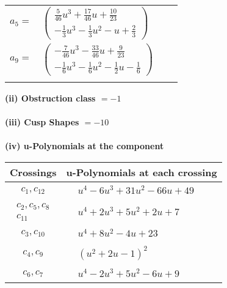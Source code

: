 \documentclass[1p]{elsarticle_modified}
\theoremstyle{definition}
\begin{document}
\begin{tabular}{m{7pt} m{180pt} m{7pt} m{180pt} }
\flushright $a_{5}=$&$\begin{pmatrix}\frac{5}{46} u^3+\frac{17}{46} u+\frac{10}{23}\\-\frac{1}{3} u^3-\frac{1}{3} u^2- u+\frac{2}{3}\end{pmatrix}$ \\
\flushright $a_{9}=$&$\begin{pmatrix}-\frac{7}{46} u^3-\frac{33}{46} u+\frac{9}{23}\\-\frac{1}{6} u^3-\frac{1}{6} u^2-\frac{1}{2} u-\frac{1}{6}\end{pmatrix}$\\&\end{tabular}
\flushleft \textbf{(ii) Obstruction class $= -1$}\\~\\
\flushleft \textbf{(iii) Cusp Shapes $= -10$}\\~\\
\newpage\renewcommand{\arraystretch}{1}
\flushleft \textbf{(iv) u-Polynomials at the component}\newline \\
\begin{tabular}{m{50pt}|m{274pt}}
Crossings & \hspace{64pt}u-Polynomials at each crossing \\
\hline $$\begin{aligned}c_{1},c_{12}\end{aligned}$$&$\begin{aligned}
&u^4-6 u^3+31 u^2-66 u+49
\end{aligned}$\\
\hline $$\begin{aligned}c_{2},c_{5},c_{8}\\c_{11}\end{aligned}$$&$\begin{aligned}
&u^4+2 u^3+5 u^2+2 u+7
\end{aligned}$\\
\hline $$\begin{aligned}c_{3},c_{10}\end{aligned}$$&$\begin{aligned}
&u^4+8 u^2-4 u+23
\end{aligned}$\\
\hline $$\begin{aligned}c_{4},c_{9}\end{aligned}$$&$\begin{aligned}
&(u^2+2 u-1)^2
\end{aligned}$\\
\hline $$\begin{aligned}c_{6},c_{7}\end{aligned}$$&$\begin{aligned}
&u^4-2 u^3+5 u^2-6 u+9
\end{aligned}$\\
\hline
\end{tabular}\\~\\
\end{document}
